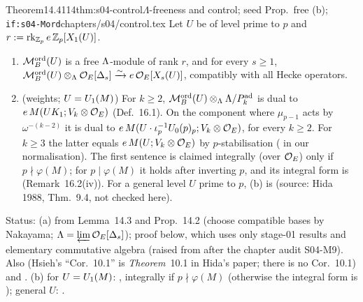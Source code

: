 \begin{quoted}{Theorem}{14.4}{114}{thm:s04-control}{$\Lambda$-freeness and control; seed Prop.~free (b); \texttt{if:s04-Mord}}{chapters/s04/control.tex}\label{rpt:thm:s04-control}
Let $U$ be of level prime to $p$ and $r:=\operatorname{rk}_{\mathbb{Z}_p}e\,\mathbb{Z}_p[X_1(U)]$.
\begin{enumerate}[label=(\alph*)]
\item $\mathcal{M}^{\mathrm{ord}}_B(U)$ is a free $\Lam$-module of rank $r$, and for every $s\ge1$,
  $\mathcal{M}^{\mathrm{ord}}_B(U)\otimes_\Lambda\mathcal{O}_E[\Delta_s]\xrightarrow{\sim}e\,\mathcal{O}_E[X_s(U)]$, compatibly with all Hecke operators.
\item (weights; $U=U_1(M)$) For $k\ge2$, $\mathcal{M}^{\mathrm{ord}}_B(U)\otimes_\Lambda\Lambda/P^{\rm ad}_k$ is dual to $e\,M(UK_{1};V_k\otimes\mathcal{O}_E)$ (Def.~16.1).
  On the component where $\mu_{p-1}$ acts by $\omega^{-(k-2)}$ it is dual to $e\,M(U\cdot\iota_p^{-1}U_0(p)_p;V_k\otimes\mathcal{O}_E)$, for every $k\ge2$.
  For $k\ge3$ the latter equals $e\,M(U;V_k\otimes\mathcal{O}_E)$ by $p$-stabilisation (\stexp{} in our normalisation).
  The first sentence is claimed integrally (over $\mathcal{O}_E$) only if $p\nmid\varphi(M)$; for $p\mid\varphi(M)$ it holds after inverting $p$,
  and its integral form is \stsketch{} (Remark~16.2(iv)). For a general level $U$ prime to $p$, (b) is \stexp{}
  (source: Hida 1988, Thm.~9.4, not checked here).
\end{enumerate}
Status: (a) \stproved{} from Lemma~14.3 and Prop.~14.2 (choose compatible bases by Nakayama;
$\Lambda=\varprojlim\mathcal{O}_E[\Delta_s]$); proof below, which uses only stage-01 results and elementary commutative algebra (raised from
\stpmc{} after the chapter audit S04-M9). Also \stcited{} \cite[{Thm.~4.2 and
its proof, p.~32: $\varprojlim_\alpha e\cO[X_\alpha]$ is $\Lam[\Delta_p]$-free, via [Hid88b, Cor.~10.1]}]{Hs} (Hsieh's ``Cor.~10.1'' is
\emph{Theorem}~10.1 in Hida's paper; there is no Cor.~10.1) and
\cite[{Prop.~3.6 and its proof, p.~28: $\varprojlim_r
S_2(U_r,\cO_f)^{\rm ord}$ is $\Lam$-free by [Hid88b, Cor.~10.4]}]{LV11}.
(b) for $U=U_1(M)$: \stcited{}, integrally if $p\nmid\varphi(M)$ (otherwise the integral form is \stsketch); general $U$: \stexp.

\end{quoted}
